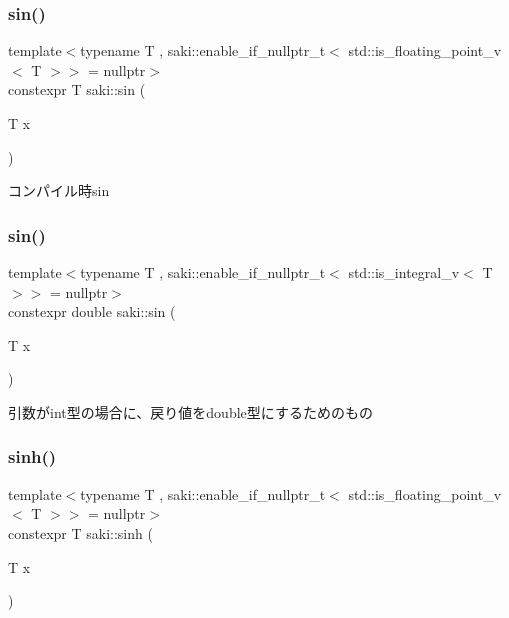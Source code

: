 \subsubsection{\texorpdfstring{sin()}{sin()}\hspace{0.1cm}{\footnotesize\ttfamily [1/2]}}
{\footnotesize\ttfamily template$<$typename T , saki\+::enable\+\_\+if\+\_\+nullptr\+\_\+t$<$ std\+::is\+\_\+floating\+\_\+point\+\_\+v$<$ T $>$$>$  = nullptr$>$ \\
constexpr T saki\+::sin (\begin{DoxyParamCaption}\item[{T}]{x }\end{DoxyParamCaption})}



コンパイル時sin 

\mbox{\label{namespacesaki_a9fd77d1e52189e28f4a5d069891501cf}} 
\subsubsection{\texorpdfstring{sin()}{sin()}\hspace{0.1cm}{\footnotesize\ttfamily [2/2]}}
{\footnotesize\ttfamily template$<$typename T , saki\+::enable\+\_\+if\+\_\+nullptr\+\_\+t$<$ std\+::is\+\_\+integral\+\_\+v$<$ T $>$$>$  = nullptr$>$ \\
constexpr double saki\+::sin (\begin{DoxyParamCaption}\item[{T}]{x }\end{DoxyParamCaption})}



引数がint型の場合に、戻り値をdouble型にするためのもの 

\mbox{\label{namespacesaki_abe1ef6db83d59a5eb2daac9bff09d312}} 
\subsubsection{\texorpdfstring{sinh()}{sinh()}\hspace{0.1cm}{\footnotesize\ttfamily [1/2]}}
{\footnotesize\ttfamily template$<$typename T , saki\+::enable\+\_\+if\+\_\+nullptr\+\_\+t$<$ std\+::is\+\_\+floating\+\_\+point\+\_\+v$<$ T $>$$>$  = nullptr$>$ \\
constexpr T saki\+::sinh (\begin{DoxyParamCaption}\item[{T}]{x }\end{DoxyParamCaption})}




